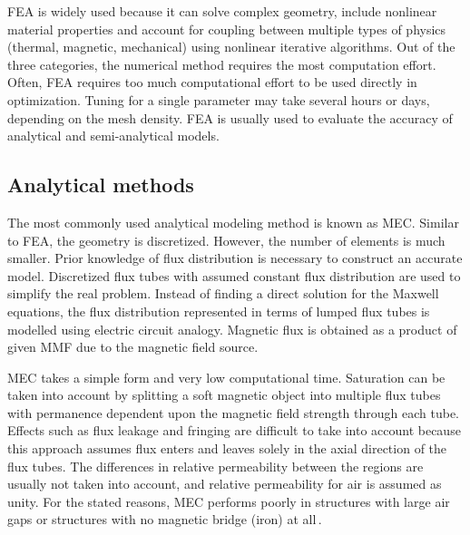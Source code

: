         \acs{FEA} is widely used because it can solve complex geometry, include nonlinear material properties and account for coupling between multiple types of physics (thermal, magnetic, mechanical) using nonlinear iterative algorithms. Out of the three categories, the numerical method requires the most computation effort. Often, \acs{FEA} requires too much computational effort to be used directly in optimization. Tuning for a single parameter may take several hours or days, depending on the mesh density. \acs{FEA} is usually used to evaluate the accuracy of analytical and semi-analytical models.

    
    \subsection{Analytical methods}                 \label{Chapter:background/modelling techniques for designing motors/analytical methods}
    
    
        The most commonly used analytical modeling method is known as \ac{MEC}. Similar to \acs{FEA}, the geometry is discretized. However, the number of elements is much smaller. Prior knowledge of flux distribution is necessary to construct an accurate model. Discretized flux tubes with assumed constant flux distribution are used to simplify the real problem. Instead of finding a direct solution for the Maxwell equations, the flux distribution represented in terms of lumped flux tubes is modelled using electric circuit analogy. Magnetic flux is obtained as a product of given \ac{MMF} due to the magnetic field source.  
        
        
        \acs{MEC} takes a simple form and very low computational time. Saturation can be taken into account by splitting a soft magnetic object into multiple flux tubes with permanence dependent upon the magnetic field strength through each tube. Effects such as flux leakage and fringing are difficult to take into account because this approach assumes flux enters and leaves solely in the axial direction of the flux tubes. The differences in relative permeability between the regions are usually not taken into account, and relative permeability for air is assumed as unity. For the stated reasons, \acs{MEC} performs poorly in structures with large air gaps or structures with no magnetic bridge (iron) at all\,\cite{DeBoeij2006ModelingStructures}. 
        
